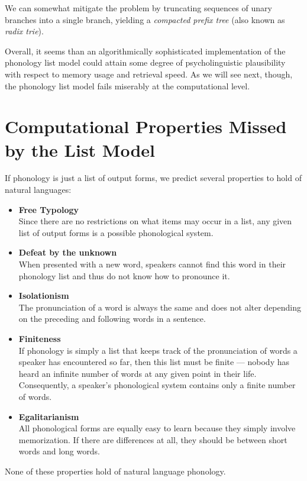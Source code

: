 We can somewhat mitigate the problem by truncating sequences of unary branches into a single branch, yielding a \emph{compacted prefix tree} (also known as \emph{radix trie}).
%
\begin{center}
    
\end{center}

Overall, it seems than an algorithmically sophisticated implementation of the phonology list model could attain some degree of psycholinguistic plausibility with respect to memory usage and retrieval speed.
As we will see next, though, the phonology list model fails miserably at the computational level.


\section{Computational Properties Missed by the List Model}

If phonology is just a list of output forms, we predict several properties to hold of natural languages:
%
\begin{itemize}
    \item \textbf{Free Typology}\\
        Since there are no restrictions on what items may occur in a list, any given list of output forms is a possible phonological system.
    \item \textbf{Defeat by the unknown}\\
        When presented with a new word, speakers cannot find this word in their phonology list and thus do not know how to pronounce it.
    \item \textbf{Isolationism}\\
        The pronunciation of a word is always the same and does not alter depending on the preceding and following words in a sentence.
    \item \textbf{Finiteness}\\
        If phonology is simply a list that keeps track of the pronunciation of words a speaker has encountered so far, then this list must be finite --- nobody has heard an infinite number of words at any given point in their life.
        Consequently, a speaker's phonological system contains only a finite number of words.
    \item \textbf{Egalitarianism}\\
        All phonological forms are equally easy to learn because they simply involve memorization.
        If there are differences at all, they should be between short words and long words.
\end{itemize}
%
None of these properties hold of natural language phonology.

